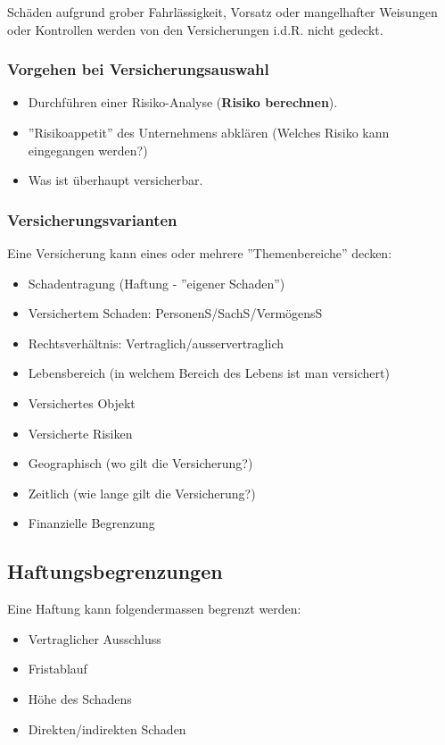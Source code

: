 Schäden aufgrund grober Fahrlässigkeit, Vorsatz oder mangelhafter Weisungen oder
Kontrollen werden von den Versicherungen i.d.R. nicht gedeckt.

\subsubsection{Vorgehen bei Versicherungsauswahl}
\begin{itemize}
	\item Durchführen einer Risiko-Analyse (\textbf{Risiko berechnen}).
	\item ''Risikoappetit'' des Unternehmens abklären (Welches Risiko kann
	eingegangen werden?)
	\item Was ist überhaupt versicherbar.
\end{itemize}

\subsubsection{Versicherungsvarianten}
Eine Versicherung kann eines oder mehrere ''Themenbereiche'' decken:
\begin{itemize}
	\item Schadentragung (Haftung - ''eigener Schaden'')
	\item Versichertem Schaden: PersonenS/SachS/VermögensS
	\item Rechtsverhältnis: Vertraglich/ausservertraglich
	\item Lebensbereich (in welchem Bereich des Lebens ist man versichert)
	\item Versichertes Objekt
	\item Versicherte Risiken
	\item Geographisch (wo gilt die Versicherung?)
	\item Zeitlich (wie lange gilt die Versicherung?)
	\item Finanzielle Begrenzung
\end{itemize}

\subsection{Haftungsbegrenzungen}
\label{sec:RisikoMgmt-Haftungsbrgrenzungen}
Eine Haftung kann folgendermassen begrenzt werden:
\begin{itemize}
	\tightlist
	\item Vertraglicher Ausschluss
	\item Fristablauf
	\item Höhe des Schadens
	\item Direkten/indirekten Schaden
\end{itemize}

